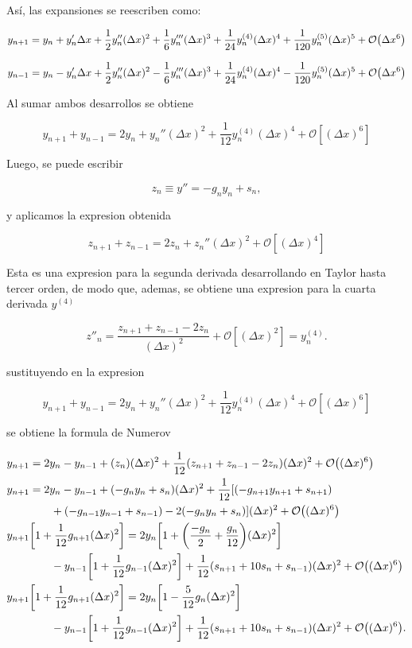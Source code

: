 \documentclass[11pt]{article}
\begin{document}
Así, las expansiones se reescriben como:

\[ y_{n+1} = y_n + y_n' \Delta x + \frac{1}{2} y_n'' (\Delta x)^2 + \frac{1}{6} y_n''' (\Delta x)^3 + \frac{1}{24} y_n^{(4)} (\Delta x)^4 + \frac{1}{120} y_n^{(5)} (\Delta x)^5 + \order{\Delta x^6} \]

\[ y_{n-1} = y_n - y_n' \Delta x + \frac{1}{2} y_n'' (\Delta x)^2 - \frac{1}{6} y_n''' (\Delta x)^3 + \frac{1}{24} y_n^{(4)} (\Delta x)^4 - \frac{1}{120} y_n^{(5)} (\Delta x)^5 + \order{\Delta x^6} \]

Al sumar ambos desarrollos se obtiene

\[ y_{n+1} + y_{n-1} = 2y_n + y_n''(\Delta x)^2 + \frac{1}{12} y_n^{(4)} (\Delta x)^4 + \mathcal{O} [(\Delta x)^6] \]

Luego, se puede escribir

\[ z_n \equiv y'' = - g_ny_n + s_n, \]

y aplicamos la expresion obtenida

\[ z_{n+1} + z_{n-1} = 2z_n + z_n'' (\Delta x)^2 + \mathcal{O}[(\Delta x)^4] \]

Esta es una expresion para la segunda derivada desarrollando en Taylor hasta tercer orden, de modo que, ademas, se obtiene una expresion para la cuarta derivada \(y^{(4)}\)

\[ z''_n = \frac{z_{n+1}+z_{n-1}-2z_n}{(\Delta x)^2} + \mathcal{O}[(\Delta x)^2] = y_n^{(4)}. \]

sustituyendo en la expresion

\[ y_{n+1} + y_{n-1} = 2y_n + y_n''(\Delta x)^2 + \frac{1}{12} y_n^{(4)} (\Delta x)^4 + \mathcal{O} [(\Delta x)^6] \]

se obtiene la formula de Numerov

 \begin{align*}
  &y_{n+1} = 2y_n - y_{n-1} + (z_n)(\Delta x)^2 + \frac{1}{12}(z_{n+1}+z_{n-1}-2z_n)(\Delta x)^2 + \order{(\Delta x)^6} \\
  &y_{n+1} =  2y_n -y_{n-1} + (-g_ny_n + s_n) (\Delta x)^2 + \frac{1}{12} [(-g_{n+1}y_{n+1}+s_{n+1}) \\
  & \qq{}\qq{} +(-g_{n-1}y_{n-1}+s_{n-1})-2(-g_ny_n+s_n)](\Delta x)^2 + \order{(\Delta x)^6} \\
  &y_{n+1}\qty[1 + \frac{1}{12}g_{n+1}(\Delta x)^2] = 2y_n \qty[1+\qty(\frac{-g_n}{2}+\frac{g_n}{12})(\Delta x)^2] \\
  & \qq{}\qq{} - y_{n-1}\qty[1+\frac{1}{12}g_{n-1}(\Delta x)^2] + \frac{1}{12}(s_{n+1}+10s_n+s_{n-1})(\Delta x)^2 + \order{(\Delta x)^6} \\
  &y_{n+1}\qty[1 + \frac{1}{12}g_{n+1}(\Delta x)^2] = 2y_n \qty[1-\frac{5}{12}g_n(\Delta x)^2] \\
  & \qq{}\qq{} -y_{n-1}\qty[1+\frac{1}{12}g_{n-1}(\Delta x)^2] + \frac{1}{12}(s_{n+1}+10s_n+s_{n-1})(\Delta x)^2 + \order{(\Delta x)^6}.
\end{align*}
\end{document}
